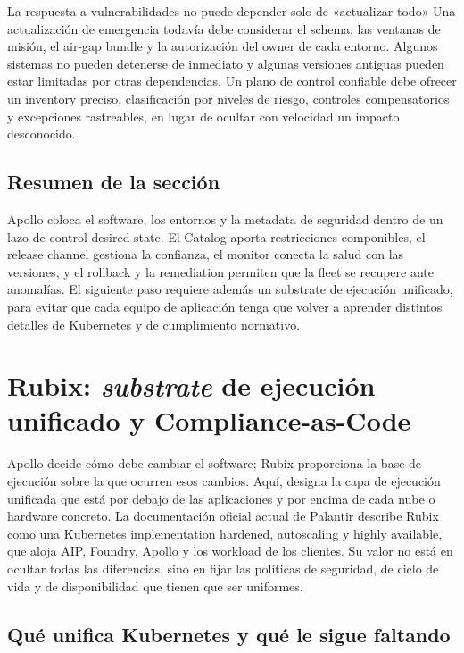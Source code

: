 \documentclass[a4paper]{article}
\begin{document}
\begin{warningbox}{La respuesta a vulnerabilidades no puede depender solo de «actualizar todo»}
Una actualización de emergencia todavía debe considerar el schema, las ventanas de misión, el air-gap bundle y la autorización del owner de cada entorno. Algunos sistemas no pueden detenerse de inmediato y algunas versiones antiguas pueden estar limitadas por otras dependencias. Un plano de control confiable debe ofrecer un inventory preciso, clasificación por niveles de riesgo, controles compensatorios y excepciones rastreables, en lugar de ocultar con velocidad un impacto desconocido.
\end{warningbox}

\subsection{Resumen de la sección}

Apollo coloca el software, los entornos y la metadata de seguridad dentro de un lazo de control desired-state. El Catalog aporta restricciones componibles, el release channel gestiona la confianza, el monitor conecta la salud con las versiones, y el rollback y la remediation permiten que la fleet se recupere ante anomalías. El siguiente paso requiere además un substrate de ejecución unificado, para evitar que cada equipo de aplicación tenga que volver a aprender distintos detalles de Kubernetes y de cumplimiento normativo.
\section{Rubix: \textit{substrate} de ejecución unificado y Compliance-as-Code}

Apollo decide cómo debe cambiar el software; Rubix proporciona la base de ejecución sobre la que ocurren esos cambios. Aquí,  designa la capa de ejecución unificada que está por debajo de las aplicaciones y por encima de cada nube o hardware concreto. La documentación oficial actual de Palantir describe Rubix como una Kubernetes implementation hardened, autoscaling y highly available, que aloja AIP, Foundry, Apollo y los workload de los clientes. Su valor no está en ocultar todas las diferencias, sino en fijar las políticas de seguridad, de ciclo de vida y de disponibilidad que tienen que ser uniformes.

\subsection{Qué unifica Kubernetes y qué le sigue faltando}
\end{document}
